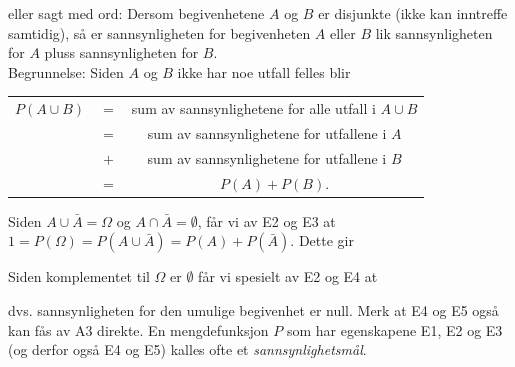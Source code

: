 \begin{center}  \end{center}
\noindent eller sagt med ord: Dersom begivenhetene $A$ og $B$ er disjunkte
(ikke kan inntreffe samtidig), så er sannsynligheten for
begivenheten $A$ eller $B$ lik sannsynligheten for $A$ pluss
sannsynligheten for $B$. \\                                 

\noindent Begrunnelse: Siden $A$ og $B$ ikke har noe utfall felles blir
\begin{center}
\begin{tabular}{ccc}
 $P(A \cup B)$&$=$& sum av sannsynlighetene for alle utfall i $A \cup B$ \\
           &$=$& sum av sannsynlighetene for utfallene i $A$ \\
           &$+$& sum av sannsynlighetene for utfallene i $B$ \\
           &$=$& $P(A) + P(B)$.
\end{tabular}
\end{center}
\noindent Siden $A \cup \bar{A} = \Omega$ og $A \cap \bar{A} = \emptyset$,
 får vi av E2 og E3 at $1 = P(\Omega) = P(A \cup \bar{A}) = P(A) + P(\bar{A})$. Dette gir

\begin{center}  \end{center}
\noindent Siden komplementet til $\Omega$ er $\emptyset$ får vi spesielt av E2 og E4 at

\begin{center}  \end{center}
dvs. sannsynligheten for den umulige begivenhet er null.
Merk at E4 og E5 også kan fås av A3 direkte. En mengdefunksjon $P$
som har egenskapene E1, E2 og E3 (og derfor også E4 og E5) kalles
ofte et {\em sannsynlighetsmål}.

